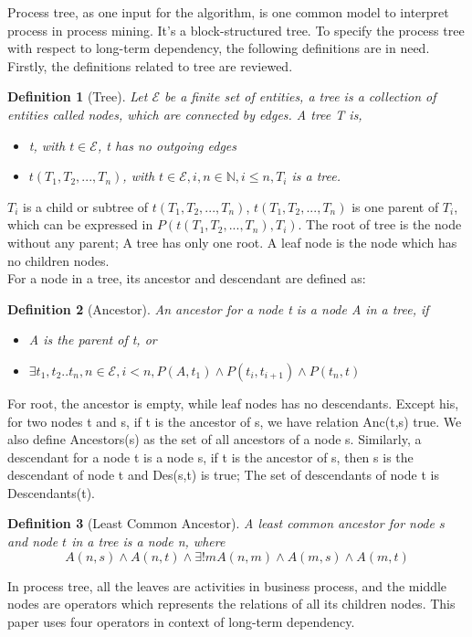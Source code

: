 \documentclass[]{article}
\newtheorem{mydef}{Definition}[section]
\begin{document}
Process tree, as one input for the algorithm, is one common model to interpret process in process mining. It's a block-structured tree. To specify the process tree with respect to long-term dependency, the following definitions are in need. Firstly, the definitions related to tree are reviewed.
\begin{mydef}[Tree]
	Let $ \mathscr{E} $ be a finite set of entities, a tree is a collection of entities called nodes, which are connected by edges. A tree T is,
	
\begin{itemize}
	\item t, with  $t\in \mathscr{E}$, t has no outgoing edges
	\item $t(T_1,T_2,...,T_n)$, with $t\in \mathscr{E}, i,n\in \mathbb{N}, i \leq n ,T_i$ is a tree.
\end{itemize}
\end{mydef}
$T_i$ is a child or subtree of $t(T_1,T_2,...,T_n)$, $t(T_1,T_2,...,T_n)$ is one parent of $T_i$, which can be expressed in $P(t(T_1,T_2,...,T_n),T_i)$. The root of tree is the node without any parent; A tree has only one root. A leaf node is the node which has no children nodes.\\
For a node in a tree, its ancestor and descendant are defined as:
\begin{mydef}[Ancestor]
	An ancestor for a node t is a node A in a tree, if 
	\begin{itemize}
	\item A is the parent of t, or
	\item $\exists t_1,t_2..t_n,n\in \mathscr{E}, i < n, P(A,t_1)\land P(t_i,t_{i+1}) \land P(t_n,t) $
   \end{itemize}
\end{mydef}
For root, the ancestor is empty, while leaf nodes has no descendants. Except his, for two nodes t and s, if t is the ancestor of s, we have relation Anc(t,s) true. We also define Ancestors(s) as the set of all ancestors of a node s. Similarly, a descendant for a node t is a node s, if t is the ancestor of s, then s is the descendant of node t and Des(s,t) is true; The set of descendants of node t is Descendants(t).
\begin{mydef}[Least Common Ancestor]
	A least common ancestor for node $s$ and node $t$ in a tree is a node n, where 
	\[A(n,s) \land A(n,t) \land \exists! m A(n,m) \land A(m,s) \land A(m,t) \]
\end{mydef}
In process tree, all the leaves are activities in business process, and the middle nodes are operators which represents the relations of all its children nodes\cite{vanderAalst:2016:PMD:2948762,leemans2013discovering}. This paper uses four operators in context of long-term dependency.
\end{document}
